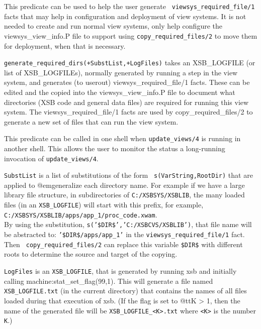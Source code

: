 \begin{description}
%
This predicate can be used to help the user generate {\tt
  viewsys\_required\_file/1} facts that may help in configuration and
deployment of view systems.  It is not needed to create and run normal
view systems, only help configure the viewsys\_view\_info.P file to
support using {\tt copy\_required\_files/2} to move them for
deployment, when that is necessary.

{\tt generate\_required\_dirs(+SubstList,+LogFiles)} takes an
XSB\_LOGFILE (or list of XSB\_LOGFILEs), normally generated by running a
step in the view system, and generates (to userout)
viewsys\_required\_file/1 facts.  These can be edited and the copied
into the viewsys\_view\_info.P file to document what directories (XSB
code and general data files) are required for running this view
system.  The viewsys\_required\_file/1 facts are used by
copy\_required\_files/2 to generate a new set of files that can run the
view system.

This predicate can be called in one shell when {\tt update\_views/4}
is running in another shell.  This allows the user to monitor the
status a long-running invocation of {\tt update\_views/4}.

{\tt SubstList} is a list of substitutions of the form {\tt
  s(VarString,RootDir)} that are applied to @em{generalize} each
directory name.  For example if we have a large library file
structure, in subdirectories of {\tt C:/XSBSYS/XSBLIB}, the many
loaded files (in an {\tt XSB\_LOGFILE}) will start with this prefix,
for example,\\
{\tt C:/XSBSYS/XSBLIB/apps/app\_1/proc\_code.xwam}.
\\
By
using the substitution, {\tt s('\$DIR\$','C:/XSBCVS/XSBLIB')}, that
file name will be abstracted to: {\tt '\$DIR\$/apps/app\_1'} in the
{\tt viewsys\_required\_file/1} fact.  Then {\tt
  copy\_required\_files/2} can replace this variable {\tt \$DIR\$}
with different roots to determine the source and target of the
copying.

{\tt LogFiles} is an {\tt XSB\_LOGFILE}, that is generated by running
xsb and initially calling machine:stat\_set\_flag(99,1).  This will
generate a file named {\tt XSB\_LOGFILE.txt} (in the current
directory) that contains the names of all files loaded during that
execution of xsb.  (If the flag is set to @{tt}K > 1, then the name of
the generated file will be {\tt XSB\_LOGFILE\_<K>.txt} where {\tt <K>} is
the number {\tt K}.)


\end{description}
